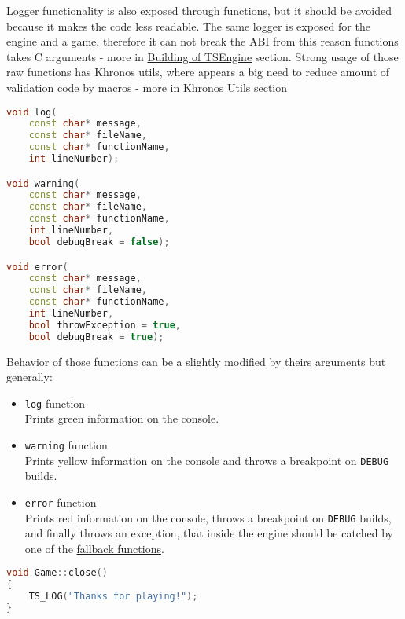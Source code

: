 Logger functionality is also exposed through functions, but it should be avoided because it makes the code less readable. The same logger is exposed for the engine and a game, therefore it can not break the ABI from this reason functions takes C arguments - more in \hyperref[sec:build]{Building of TSEngine} section.
Strong usage of those raw functions has Khronos utils, where appears a big need to reduce amount of validation code by macros - more in \hyperref[sec:khronos_utils]{Khronos Utils} section
\begin{lstlisting}[language=c++, caption=Logger's functions (./engine/include/tsengine/logger.h)]
void log(
    const char* message,
    const char* fileName,
    const char* functionName,
    int lineNumber);

void warning(
    const char* message,
    const char* fileName,
    const char* functionName,
    int lineNumber,
    bool debugBreak = false);

void error(
    const char* message,
    const char* fileName,
    const char* functionName,
    int lineNumber,
    bool throwException = true,
    bool debugBreak = true);
\end{lstlisting}
Behavior of those functions can be a slightly modified by theirs arguments but generally:
\begin{itemize}
    \item \texttt{log} function\\
    Prints green information on the console.
    \item \texttt{warning} function\\ 
    Prints yellow information on the console and throws a breakpoint on \texttt{DEBUG} builds.
    \item \texttt{error} function\\
    Prints red information on the console, throws a breakpoint on \texttt{DEBUG} builds, and finally throws an exception, that inside the engine should be catched by one of the \hyperref[sec:fallbacks]{fallback functions}.
\end{itemize}

\begin{lstlisting}[language=c++, caption=An example of the logger message(./engine/include/tsengine/logger.h)]
void Game::close()
{
    TS_LOG("Thanks for playing!");
}
\end{lstlisting}